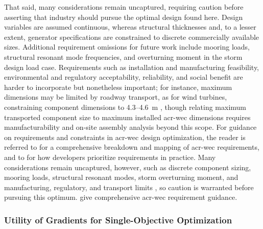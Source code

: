\ifdefined\DISSERTATION
    That said, many considerations remain uncaptured, requiring caution before asserting that industry should pursue the optimal design found here.
    Design variables are assumed continuous, whereas structural thicknesses and, to a lesser extent, generator specifications are constrained to discrete commercially available sizes.
    Additional requirement omissions for future work include mooring loads, structural resonant mode frequencies, and overturning moment in the storm design load case.
    Requirements such as installation and manufacturing feasibility, environmental and regulatory acceptability, reliability, and social benefit are harder to incorporate but nonetheless important;
    for instance, maximum dimensions may be limited by roadway transport, as for wind turbines, constraining component dimensions to 4.3--4.6~m \citep{cotrell_analysis_2014}, though relating maximum transported component size to maximum installed \gls{acr-wec} dimensions requires manufacturability and on-site assembly analysis beyond this scope.
    For guidance on requirements and constraints in \gls{acr-wec} design optimization, the reader is referred to \citet{bull_systems_2017,babarit_stakeholder_2017} for a comprehensive breakdown and mapping of \gls{acr-wec} requirements, and to \citet{trueworthy_wave_2020} for how developers prioritize requirements in practice.
\else
    Many considerations remain uncaptured, however, such as discrete component sizing, mooring loads, structural resonant modes, storm overturning moment, and manufacturing, regulatory, and transport limits \citep{cotrell_analysis_2014}, so caution is warranted before pursuing this optimum.
    \citet{bull_systems_2017,babarit_stakeholder_2017,trueworthy_wave_2020} give comprehensive \gls{acr-wec} requirement guidance.
\fi

\subsubsection{Utility of Gradients for Single-Objective Optimization}

